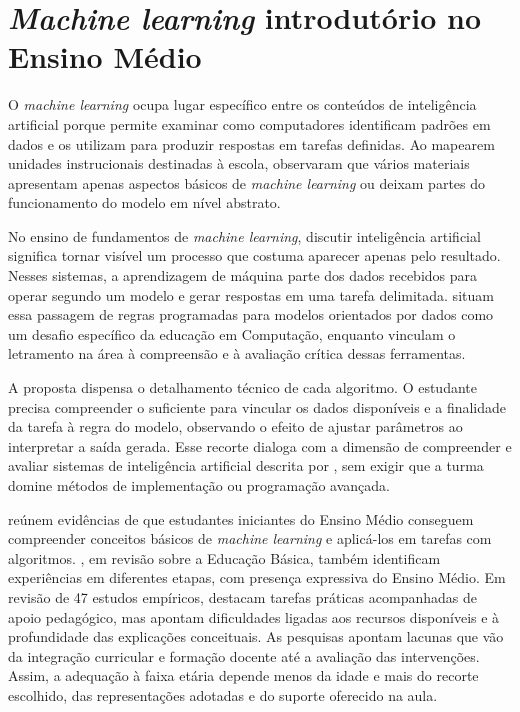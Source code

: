 \section{\textit{Machine learning} introdutório no Ensino Médio}

O \textit{machine learning} ocupa lugar específico entre os conteúdos de inteligência artificial porque permite examinar como computadores identificam padrões em dados e os utilizam para produzir respostas em tarefas definidas. Ao mapearem unidades instrucionais destinadas à escola,  observaram que vários materiais apresentam apenas aspectos básicos de \textit{machine learning} ou deixam partes do funcionamento do modelo em nível abstrato.

No ensino de fundamentos de \textit{machine learning}, discutir inteligência artificial significa tornar visível um processo que costuma aparecer apenas pelo resultado. Nesses sistemas, a aprendizagem de máquina parte dos dados recebidos para operar segundo um modelo e gerar respostas em uma tarefa delimitada.  situam essa passagem de regras programadas para modelos orientados por dados como um desafio específico da educação em Computação, enquanto  vinculam o letramento na área à compreensão e à avaliação crítica dessas ferramentas.

A proposta dispensa o detalhamento técnico de cada algoritmo. O estudante precisa compreender o suficiente para vincular os dados disponíveis e a finalidade da tarefa à regra do modelo, observando o efeito de ajustar parâmetros ao interpretar a saída gerada. Esse recorte dialoga com a dimensão de compreender e avaliar sistemas de inteligência artificial descrita por , sem exigir que a turma domine métodos de implementação ou programação avançada.

 reúnem evidências de que estudantes iniciantes do Ensino Médio conseguem compreender conceitos básicos de \textit{machine learning} e aplicá-los em tarefas com algoritmos. , em revisão sobre a Educação Básica, também identificam experiências em diferentes etapas, com presença expressiva do Ensino Médio. Em revisão de 47 estudos empíricos,  destacam tarefas práticas acompanhadas de apoio pedagógico, mas apontam dificuldades ligadas aos recursos disponíveis e à profundidade das explicações conceituais. As pesquisas apontam lacunas que vão da integração curricular e formação docente até a avaliação das intervenções. Assim, a adequação à faixa etária depende menos da idade e mais do recorte escolhido, das representações adotadas e do suporte oferecido na aula.

